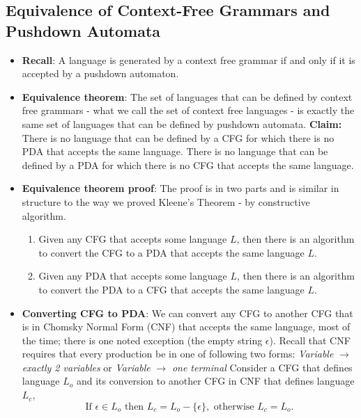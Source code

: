 \documentclass{report}
\begin{document}
    \subsection{Equivalence of Context-Free Grammars and Pushdown Automata}
    \begin{itemize}
        \item \textbf{Recall}: A language is generated by a context free grammar if and only if it is accepted by a pushdown automaton.
            \bigbreak \noindent 
        \item \textbf{Equivalence theorem}: The set of languages that can be defined by context free grammars - what we call the
            set of context free languages - is exactly the same set of languages that can be defined by pushdown
            automata.
            \bigbreak \noindent 
            \textbf{Claim:} There is no language that can be defined by a CFG for which there is no PDA that accepts the same language.
            \bigbreak \noindent 
            There is no language that can be defined by a PDA for which there is no CFG that accepts the same language.
        \item \textbf{Equivalence theorem proof}: The proof is in two parts and is similar in structure to the way
            we proved Kleene's Theorem - by constructive algorithm.
            \begin{enumerate}
                \item Given any CFG that accepts some language $L$, then there is an algorithm to convert the CFG to a PDA that accepts the same language $L$.
                \item Given any PDA that accepts some language $L$, then there is an algorithm to convert the PDA to a CFG that accepts the same language $L$.
            \end{enumerate}
        \item \textbf{Converting CFG to PDA}: We can convert any CFG to another CFG that is in Chomsky Normal Form (CNF) that accepts the same language, most of the time; there is one noted exception (the empty string $\epsilon$).
            \bigbreak \noindent 
            Recall that CNF requires that every production be in one of following two forms: \textit{Variable} $\to$ \textit{exactly 2 variables} or \textit{Variable} $\to$ \textit{one terminal}
            \bigbreak \noindent 
            Consider a CFG that defines language \( L_o \) and its conversion to another CFG in CNF that defines language \( L_c \),
            \[
                \text{If } \epsilon \in L_o \text{ then } L_c = L_o - \{\epsilon\}, \text{ otherwise } L_c = L_o.
\]
\end{itemize}
\end{document}
